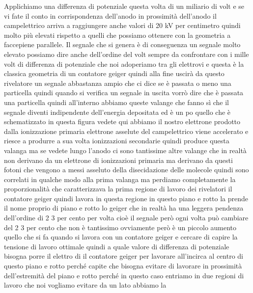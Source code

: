 {Applichiamo una differenza di potenziale questa volta di un miliario di volt e se vi fate il conto in corrispondenza dell'anodo in prossimità dell'anodo il campelettrico arriva a raggiungere anche valori di 20 kV per centimetro quindi molto più elevati rispetto a quelli che possiamo ottenere con la geometria a faccepiene parallele. Il segnale che si genera è di conseguenza un segnale molto elevato possiamo dire anche dell'ordine del volt sempre da confrontare con i mille volt di differenza di potenziale che noi adoperiamo tra gli elettrovi e questa è la classica geometria di un contatore geiger quindi alla fine uscirà da questo rivelatore un segnale abbastanza ampio che ci dice se è passata o meno una particella quindi quando si verifica un segnale in uscita vorrò dire che è passata una particella quindi all'interno abbiamo queste valange che fanno sì che il segnale diventi indipendente dell'energia depositata ed è un po quello che è schematizzato in questa figura vedete qui abbiamo il nostro elettrone prodotto dalla ionizzazione primaria elettrone asselute del campelettrico viene accelerato e riesce a produrre a sua volta ionizzazioni secondarie quindi produce questa valanga ma se vedete lungo l'anodo ci sono tantissime altre valange che in realtà non derivano da un elettrone di ionizzazioni primaria ma derivano da questi fotoni che vengono a messi asseluto della disecidazione delle molecole quindi sono correlati in qualche modo alla prima valanga ma perdiamo completamente la proporzionalità che caratterizzava la prima regione di lavoro dei rivelatori il contatore geiger quindi lavora in questa regione in questo piano e rotto la prende il nome proprio di piano e rotto lo geiger che in realtà ha una leggera pendenza dell'ordine di 2 3 per cento per volta cioè il segnale però ogni volta può cambiare del 2 3 per cento che non è tantissimo ovviamente però è un piccolo aumento quello che si fa quando si lavora con un contatore geiger e cercare di capire la tensione di lavoro ottimale quindi a quale valore di differenza di potenziale bisogna porre il elettro di il contatore geiger per lavorare all'incirca al centro di questo piano e rotto perché capite che bisogna evitare di lavorare in prossimità dell'estremità del piano e rotto perché in questo caso entriamo in due regioni di lavoro che noi vogliamo evitare da un lato abbiamo la 

}
